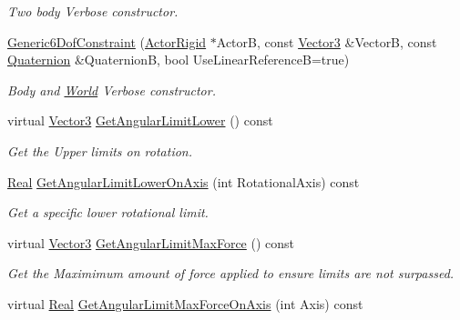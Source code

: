 \begin{DoxyCompactItemize}
\begin{DoxyCompactList}\small\item\em Two body Verbose constructor. \item\end{DoxyCompactList}\item 
\hyperlink{classMezzanine_1_1Generic6DofConstraint_a41ed7866900eebbfb917ab426c21cf43}{Generic6DofConstraint} (\hyperlink{classMezzanine_1_1ActorRigid}{ActorRigid} $\ast$ActorB, const \hyperlink{classMezzanine_1_1Vector3}{Vector3} \&VectorB, const \hyperlink{classMezzanine_1_1Quaternion}{Quaternion} \&QuaternionB, bool UseLinearReferenceB=true)
\begin{DoxyCompactList}\small\item\em Body and \hyperlink{classMezzanine_1_1World}{World} Verbose constructor. \item\end{DoxyCompactList}\item 
virtual \hyperlink{classMezzanine_1_1Vector3}{Vector3} \hyperlink{classMezzanine_1_1Generic6DofConstraint_a1a9a5c30e5d2a39ceb99232ad375d9ab}{GetAngularLimitLower} () const 
\begin{DoxyCompactList}\small\item\em Get the Upper limits on rotation. \item\end{DoxyCompactList}\item 
\hyperlink{namespaceMezzanine_a726731b1a7df72bf3583e4a97282c6f6}{Real} \hyperlink{classMezzanine_1_1Generic6DofConstraint_a5c69e50d1fe27ac8bb99a60d665cee48}{GetAngularLimitLowerOnAxis} (int RotationalAxis) const 
\begin{DoxyCompactList}\small\item\em Get a specific lower rotational limit. \item\end{DoxyCompactList}\item 
virtual \hyperlink{classMezzanine_1_1Vector3}{Vector3} \hyperlink{classMezzanine_1_1Generic6DofConstraint_ae0734d106fddaea99c36a27cdcddab3c}{GetAngularLimitMaxForce} () const 
\begin{DoxyCompactList}\small\item\em Get the Maximimum amount of force applied to ensure limits are not surpassed. \item\end{DoxyCompactList}\item 
virtual \hyperlink{namespaceMezzanine_a726731b1a7df72bf3583e4a97282c6f6}{Real} \hyperlink{classMezzanine_1_1Generic6DofConstraint_abb6d534f3fd2416c1642d7574e68565d}{GetAngularLimitMaxForceOnAxis} (int Axis) const 

\end{DoxyCompactItemize}
